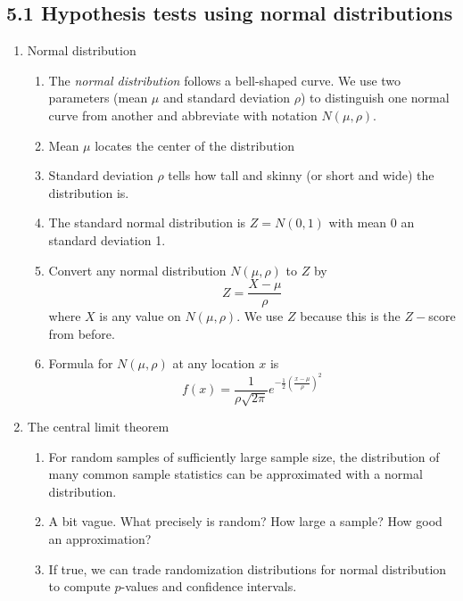 \documentclass{article}
\begin{document}
\subsection{5.1 Hypothesis tests using normal distributions}
\begin{enumerate}

\item Normal distribution
\begin{enumerate}
\item The \emph{normal distribution} follows a bell-shaped curve. We use two parameters (mean $\mu$ and standard deviation $\rho$) to distinguish one normal curve from another and abbreviate with notation $N(\mu, \rho)$.
\item Mean $\mu$ locates the center of the distribution
\item Standard deviation $\rho$ tells how tall and skinny (or short and wide) the distribution is.
\item The standard normal distribution is $Z=N(0,1)$ with mean 0 an standard deviation 1.
\item Convert any normal distribution $N(\mu, \rho)$ to $Z$ by
\[
Z = \frac{X-\mu}{\rho}
\]
where $X$ is any value on $N(\mu, \rho)$. We use $Z$ because this is the $Z-$score from before.
\item Formula for $N(\mu, \rho)$ at any location $x$ is
\[
f(x) = \frac{1}{\rho \sqrt{2\pi}} e^{-\frac{1}{2} \left(\frac{x-\mu}{\rho}\right)^2}
\]
\end{enumerate}

\item The central limit theorem
\begin{enumerate}
\item For random samples of sufficiently large sample size, the distribution of many common sample statistics can be approximated with a normal distribution.
\item A bit vague. What precisely is random? How large a sample? How good an approximation?
\item If true, we can trade randomization distributions for normal distribution to compute $p$-values and confidence intervals.
\end{enumerate}


\end{enumerate}
\end{document}

